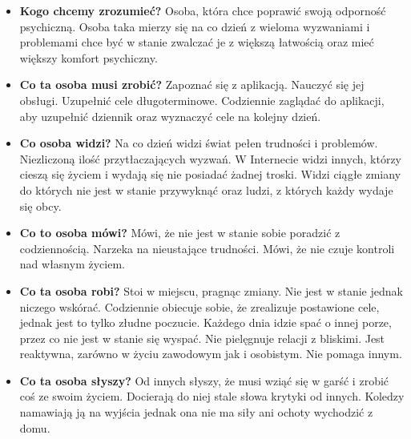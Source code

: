 \begin{itemize}
    \item \textbf{Kogo chcemy zrozumieć?} Osoba, która chce poprawić swoją
          odporność psychiczną. Osoba taka mierzy się na co dzień z wieloma
          wyzwaniami i problemami chce być w stanie zwalczać je z większą
          łatwością oraz mieć większy komfort psychiczny.
    \item \textbf{Co ta osoba musi zrobić?} Zapoznać się z aplikacją. Nauczyć
          się jej obsługi. Uzupełnić cele długoterminowe. Codziennie zaglądać do
          aplikacji, aby uzupełnić dziennik oraz wyznaczyć cele na kolejny
          dzień.
    \item \textbf{Co osoba widzi?} Na co dzień widzi świat pełen trudności i
          problemów. Niezliczoną ilość przytłaczających wyzwań. W Internecie
          widzi innych, którzy cieszą się życiem i wydają się nie posiadać
          żadnej troski. Widzi ciągłe zmiany do których nie jest w stanie
          przywyknąć oraz ludzi, z których każdy wydaje się obcy.
    \item \textbf{Co to osoba mówi?} Mówi, że nie jest w stanie sobie poradzić z
          codziennością. Narzeka na nieustające trudności. Mówi, że nie czuje
          kontroli nad własnym życiem.
    \item \textbf{Co ta osoba robi?} Stoi w miejscu, pragnąc zmiany. Nie jest w
          stanie jednak niczego wskórać. Codziennie obiecuje sobie, że
          zrealizuje postawione cele, jednak jest to tylko złudne poczucie.
          Każdego dnia idzie spać o innej porze, przez co nie jest w stanie się
          wyspać. Nie pielęgnuje relacji z bliskimi. Jest reaktywna, zarówno w
          życiu zawodowym jak i osobistym. Nie pomaga innym.
    \item \textbf{Co ta osoba słyszy?} Od innych słyszy, że musi wziąć się w
          garść i zrobić coś ze swoim życiem. Docierają do niej stale słowa
          krytyki od innych. Koledzy namawiają ją na wyjścia jednak ona nie ma
          siły ani ochoty wychodzić z domu.


\end{itemize}
